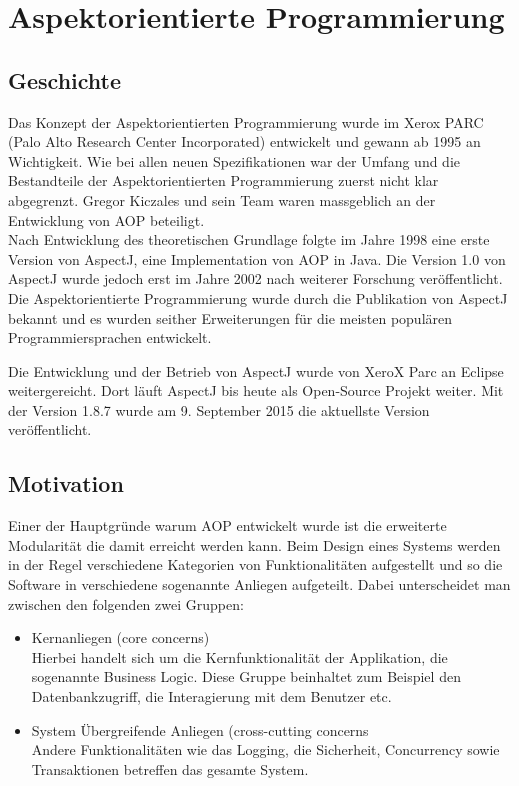 \chapter{Aspektorientierte Programmierung}
\label{chap:aop}

\section{Geschichte}
\label{sec:aop_geschichte}

Das Konzept der Aspektorientierten Programmierung wurde im Xerox PARC (Palo Alto Research Center Incorporated) entwickelt und gewann ab 1995 an Wichtigkeit. Wie bei allen neuen Spezifikationen war der Umfang und die Bestandteile der Aspektorientierten Programmierung zuerst nicht klar abgegrenzt. Gregor Kiczales und sein Team waren massgeblich an der Entwicklung von AOP beteiligt.\\
Nach Entwicklung des theoretischen Grundlage folgte im Jahre 1998 eine erste Version von AspectJ, eine Implementation von AOP in Java. Die Version 1.0 von AspectJ wurde jedoch erst im Jahre 2002 nach weiterer Forschung veröffentlicht.\cite{lopes:historyaop} \\
Die Aspektorientierte Programmierung wurde durch die Publikation von AspectJ bekannt und es wurden seither Erweiterungen für die meisten populären Programmiersprachen entwickelt. 

Die Entwicklung und der Betrieb von AspectJ wurde von XeroX Parc an Eclipse weitergereicht. Dort läuft AspectJ bis heute als Open-Source Projekt weiter. Mit der Version 1.8.7 wurde am 9. September 2015 die aktuellste Version veröffentlicht.

\section{Motivation}
\label{sec:aop_motivation}

Einer der Hauptgründe warum AOP entwickelt wurde ist die erweiterte Modularität die damit erreicht werden kann. Beim Design eines Systems werden in der Regel verschiedene Kategorien von Funktionalitäten aufgestellt und so die Software in verschiedene sogenannte Anliegen aufgeteilt. Dabei unterscheidet man zwischen den folgenden zwei Gruppen:

\begin{itemize}
	\item Kernanliegen (core concerns)\\
	Hierbei handelt sich um die Kernfunktionalität der Applikation, die sogenannte Business Logic. Diese Gruppe beinhaltet zum Beispiel den Datenbankzugriff, die Interagierung mit dem Benutzer etc.
	\item System Übergreifende Anliegen (cross-cutting concerns \\
	Andere Funktionalitäten wie das Logging, die Sicherheit, Concurrency sowie Transaktionen betreffen das gesamte System.
\end{itemize}

